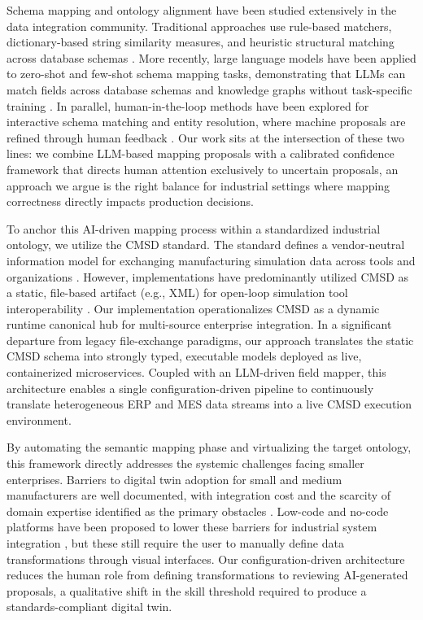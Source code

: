 \documentclass[3p,times,procedia]{elsarticle}
\begin{document}
Schema mapping and ontology alignment have been studied extensively in the data integration community. Traditional approaches use rule-based matchers, dictionary-based string similarity measures, and heuristic structural matching across database schemas \cite{Halevy2005Why}. More recently, large language models have been applied to zero-shot and few-shot schema mapping tasks, demonstrating that LLMs can match fields across database schemas and knowledge graphs without task-specific training \cite{parciak2024schemamatchinglargelanguage}. In parallel, human-in-the-loop methods have been explored for interactive schema matching and entity resolution, where machine proposals are refined through human feedback \cite{10.14778/3352063.3352068}. Our work sits at the intersection of these two lines: we combine LLM-based mapping proposals with a calibrated confidence framework that directs human attention exclusively to uncertain proposals, an approach we argue is the right balance for industrial settings where mapping correctness directly impacts production decisions.

To anchor this AI-driven mapping process within a standardized industrial ontology, we utilize the CMSD standard. The standard defines a vendor-neutral information model for exchanging manufacturing simulation data across tools and organizations \cite{58196}. However, implementations have predominantly utilized CMSD as a static, file-based artifact (e.g., XML) for open-loop simulation tool interoperability \cite{26646,Zhao2024An}. Our implementation operationalizes CMSD as a dynamic runtime canonical hub for multi-source enterprise integration. In a significant departure from legacy file-exchange paradigms, our approach translates the static CMSD schema into strongly typed, executable models deployed as live, containerized microservices. Coupled with an LLM-driven field mapper, this architecture enables a single configuration-driven pipeline to continuously translate heterogeneous ERP and MES data streams into a live CMSD execution environment.

By automating the semantic mapping phase and virtualizing the target ontology, this framework directly addresses the systemic challenges facing smaller enterprises. Barriers to digital twin adoption for small and medium manufacturers are well documented, with integration cost and the scarcity of domain expertise identified as the primary obstacles \cite{Lei2023Challenges,Broo2021Digital,Opoku2023Barriers}. Low-code and no-code platforms have been proposed to lower these barriers for industrial system integration \cite{Hurlburt2025Low}, but these still require the user to manually define data transformations through visual interfaces. Our configuration-driven architecture reduces the human role from defining transformations to reviewing AI-generated proposals, a qualitative shift in the skill threshold required to produce a standards-compliant digital twin.
\end{document}
